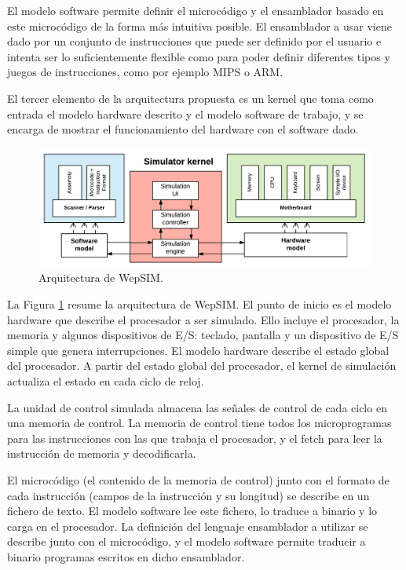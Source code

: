 El modelo software permite definir el microcódigo y el ensamblador basado en este microcódigo de la forma más intuitiva posible. El ensamblador a usar viene dado por un conjunto de instrucciones que puede ser definido por el usuario e intenta ser lo suficientemente flexible como para poder definir diferentes tipos y juegos de instrucciones, como por ejemplo MIPS o ARM.

El tercer elemento de la arquitectura propuesta es un kernel que toma como entrada el modelo hardware descrito y el modelo software de trabajo, y se encarga de mostrar el funcionamiento del hardware con el software dado.

\begin{figure}[htbp]
 	\centering
 	\includegraphics[width=14cm]{figures/architecture_diagram}
 	\caption{Arquitectura de WepSIM.}
	\label{fig:architecture_diagram}
\end{figure}

La Figura \ref{fig:architecture_diagram} resume la arquitectura de WepSIM. El punto de inicio es el modelo hardware que describe el procesador a ser simulado. Ello incluye el procesador, la memoria y algunos dispositivos de E/S: teclado, pantalla y un dispositivo de E/S simple que genera interrupciones. El modelo hardware describe el estado global del procesador. A partir del estado global del procesador, el kernel de simulación actualiza el estado en cada ciclo de reloj.

La unidad de control simulada almacena las señales de control de cada ciclo en una memoria de control. La memoria de control tiene todos los microprogramas para las instrucciones con las que trabaja el procesador, y el fetch para leer la instrucción de memoria y decodificarla.


El microcódigo (el contenido de la memoria de control) junto con el formato de cada instrucción (campos de la instrucción y su longitud) se describe en un fichero de texto. El modelo software lee este fichero, lo traduce a binario y lo carga en el procesador. La definición del lenguaje ensamblador a utilizar se describe junto con el microcódigo, y el modelo software permite traducir a binario programas escritos en dicho ensamblador.


